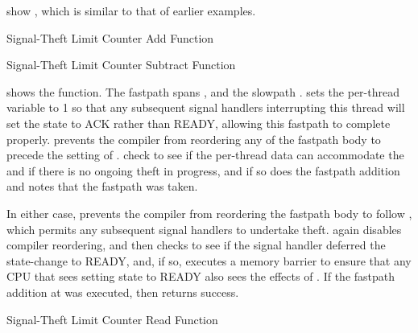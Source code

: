 \begin{fcvref}
 show , which is similar to that of
earlier examples.
\end{fcvref}

\begin{listing}

\caption{Signal-Theft Limit Counter Add Function}
\label{lst:count:Signal-Theft Limit Counter Add Function}
\end{listing}

\begin{listing}

\caption{Signal-Theft Limit Counter Subtract Function}
\label{lst:count:Signal-Theft Limit Counter Subtract Function}
\end{listing}

\begin{fcvref}
shows the  function.
The fastpath spans , and the slowpath
.
 sets the per-thread  variable to 1 so that
any subsequent signal handlers interrupting this thread will
set the  state to ACK rather than READY, allowing this
fastpath to complete properly.
 prevents the compiler from reordering any of the fastpath body
to precede the setting of .
 check to see
if the per-thread data can accommodate
the  and if there is no ongoing theft in progress,
and if so  does the fastpath addition and
 notes that
the fastpath was taken.

In either case,  prevents the compiler from reordering the
fastpath body to follow , which permits any subsequent signal
handlers to undertake theft.
 again disables compiler reordering, and then
checks to see if the signal handler deferred the 
state-change to READY, and, if so,  executes a memory
barrier to ensure that any CPU that sees  setting state to
READY also sees the effects of .
If the fastpath addition at  was executed, then
 returns
success.
\end{fcvref}

\begin{listing}

\caption{Signal-Theft Limit Counter Read Function}
\label{lst:count:Signal-Theft Limit Counter Read Function}
\end{listing}

